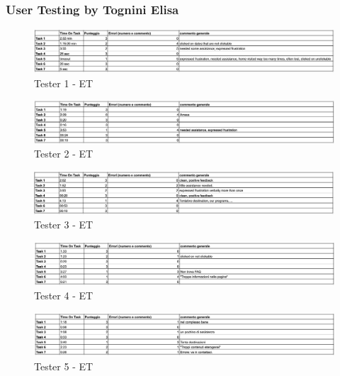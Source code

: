 \documentclass[11pt]{article} %
\begin{document}
\subsubsection{User Testing by Tognini Elisa}

\begin{figure}[H]
  \centering
  \includegraphics[width=\textwidth]{Images/Test/TestET1.png}
  \caption{Tester 1 - ET}
\end{figure}

\begin{figure}[H]
  \centering
  \includegraphics[width=\textwidth]{Images/Test/TestET2.png}
  \caption{Tester 2 - ET}
\end{figure}

\begin{figure}[H]
  \centering
  \includegraphics[width=\textwidth]{Images/Test/TestET3.png}
  \caption{Tester 3 - ET}
\end{figure}

\begin{figure}[H]
  \centering
  \includegraphics[width=\textwidth]{Images/Test/TestET4.png}
  \caption{Tester 4 - ET}
\end{figure}

\begin{figure}[H]
  \centering
  \includegraphics[width=\textwidth]{Images/Test/TestET5.png}
  \caption{Tester 5 - ET}
\end{figure}
\end{document}
